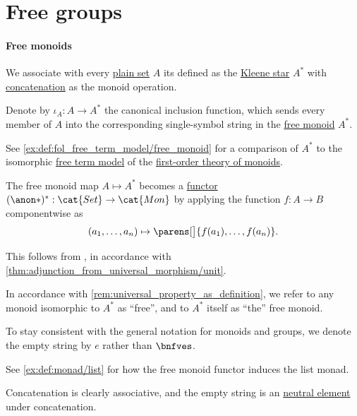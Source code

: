 \section{Free groups}\label{sec:free_groups}

\paragraph{Free monoids}

\begin{definition}\label{def:free_monoid}
  We associate with every \hyperref[def:set]{plain set} \( A \) its  defined as the \hyperref[def:formal_language/kleene_star]{Kleene star} \( A^* \) with \hyperref[def:formal_language/concatenation]{concatenation} as the monoid operation.

  Denote by \( \iota_A: A \to A^* \) the canonical inclusion function, which sends every member of \( A \) into the corresponding single-symbol string in the \hyperref[def:free_monoid]{free monoid} \( A^* \).
\end{definition}
\begin{comments}
  \item See \cref{ex:def:fol_free_term_model/free_monoid} for a comparison of \( A^* \) to the isomorphic \hyperref[def:fol_free_term_model]{free term model} of the \hyperref[def:monoid/theory]{first-order theory of monoids}.

  \item The free monoid map \( A \mapsto A^* \) becomes a \hyperref[def:functor]{functor} \( (\anon*)^*: \cat{Set} \to \cat{Mon} \) by applying the function \( f: A \to B \) componentwise as
  \begin{equation*}
    (a_1, \ldots, a_n) \mapsto \parens[\big]{ f(a_1), \ldots, f(a_n) }.
  \end{equation*}

  This follows from , in accordance with \cref{thm:adjunction_from_universal_morphism/unit}.

  \item In accordance with \cref{rem:universal_property_as_definition}, we refer to any monoid isomorphic to \( A^* \) as \enquote{free}, and to \( A^* \) itself as \enquote{the} free monoid.

  \item To stay consistent with the general notation for monoids and groups, we denote the empty string by \( e \) rather than \( \bnfves \).

  \item See \cref{ex:def:monad/list} for how the free monoid functor induces the list monad.
\end{comments}
\begin{defproof}
  Concatenation is clearly associative, and the empty string is an \hyperref[def:semigroup_neutral_element]{neutral element} under concatenation.
\end{defproof}

